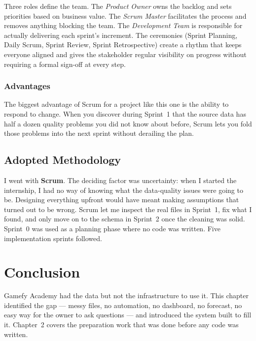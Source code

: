 \documentclass[12pt, a4paper]{report}
\begin{document}
Three roles define the team. The \textit{Product Owner} owns the backlog and
sets priorities based on business value. The \textit{Scrum Master} facilitates
the process and removes anything blocking the team. The \textit{Development
Team} is responsible for actually delivering each sprint's increment. The
ceremonies (Sprint Planning, Daily Scrum, Sprint Review, Sprint Retrospective)
create a rhythm that keeps everyone aligned and gives the stakeholder regular
visibility on progress without requiring a formal sign-off at every step.

\subsubsection{Advantages}

The biggest advantage of Scrum for a project like this one is the ability to
respond to change. When you discover during Sprint~1 that the source data has
half a dozen quality problems you did not know about before, Scrum lets you
fold those problems into the next sprint without derailing the plan.

\subsection{Adopted Methodology}

I went with \textbf{Scrum}. The deciding factor was uncertainty: when I started
the internship, I had no way of knowing what the data-quality issues were going
to be. Designing everything upfront would have meant making assumptions that
turned out to be wrong. Scrum let me inspect the real files in Sprint~1, fix
what I found, and only move on to the schema in Sprint~2 once the cleaning was
solid. Sprint~0 was used as a planning phase where no code was written. Five
implementation sprints followed.

\section{Conclusion}

Gamefy Academy had the data but not the infrastructure to use it. This chapter
identified the gap — messy files, no automation, no dashboard, no forecast,
no easy way for the owner to ask questions — and introduced the system built
to fill it. Chapter~2 covers the preparation work that was done before any
code was written.

\end{document}

